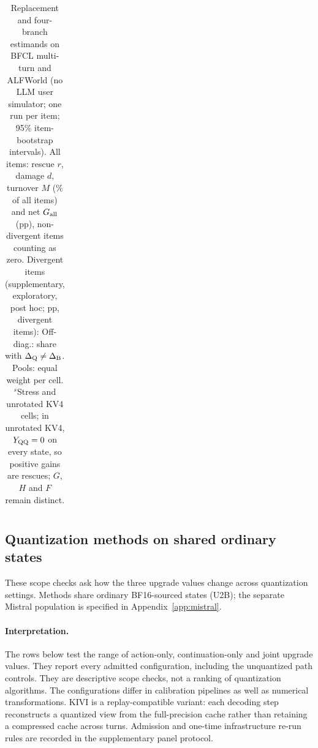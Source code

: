 \begin{table}[t]
\begin{tabular*}{\textwidth}{@{\extracolsep{\fill}}lllllll@{}}
\bottomrule
\end{tabular*}
\par\vspace{6pt}
\caption{Replacement and four-branch estimands on BFCL multi-turn and ALFWorld (no LLM user simulator; one run per item; 95\% item-bootstrap intervals). All items: rescue $r$, damage $d$, turnover $M$ (\% of all items) and net $G_{\mathrm{all}}$ (pp), non-divergent items counting as zero. Divergent items (supplementary, exploratory, post hoc; pp, divergent items): Off-diag.: share with $\Delta_{\mathrm{Q}}\neq\Delta_{\mathrm{B}}$. Pools: equal weight per cell. $^s$Stress and unrotated KV4 cells; in unrotated KV4, $Y_{\mathrm{QQ}}=0$ on every state, so positive gains are rescues; $G$, $H$ and $F$ remain distinct.}
\label{tab:extr2}
\end{table}

\subsection{Quantization methods on shared ordinary states}
\label{app:panels}

These scope checks ask how the three upgrade values change across quantization settings. Methods share ordinary BF16-sourced states (U2B); the separate Mistral population is specified in Appendix~\ref{app:mistral}.

\paragraph{Interpretation.} The rows below test the range of action-only, continuation-only and joint upgrade values. They report every admitted configuration, including the unquantized path controls. They are descriptive scope checks, not a ranking of quantization algorithms. The configurations differ in calibration pipelines as well as numerical transformations. KIVI is a replay-compatible variant: each decoding step reconstructs a quantized view from the full-precision cache rather than retaining a compressed cache across turns. Admission and one-time infrastructure re-run rules are recorded in the supplementary panel protocol.
